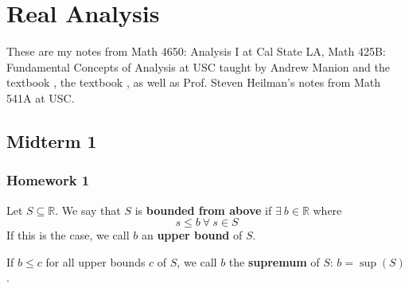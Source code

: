 %
%
%
%
%
%
%
%
%
%
%
%
%

\chapter{Real Analysis}

These are my notes from Math 4650: Analysis I at Cal State LA, Math 425B: Fundamental Concepts of Analysis at USC taught by Andrew Manion and the textbook \citep{pugh2015real}, the textbook \citep{rudin1976principles}, as well as Prof. Steven Heilman's notes from Math 541A at USC.


\section{Midterm 1}

\subsection{Homework 1}

\begin{definition} Let \(S \subseteq \mathbb{R}\). We say that \(S\) is \textbf{bounded from above} if \(\exists \ b \in \mathbb{R}\) where \[s \leq b \ \forall \ s \in S\]If this is the case, we call \(b\) an \textbf{upper bound} of \(S\).

If \(b \leq c \) for all upper bounds \(c\) of \(S\), we call \(b\) the \textbf{supremum} of \(S\): \(b = \sup(S)\).

\end{definition}

